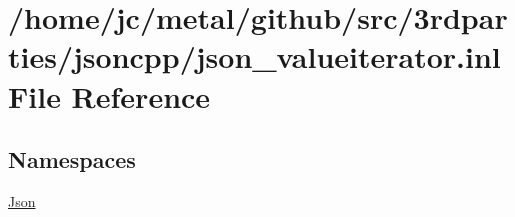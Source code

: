\hypertarget{json__valueiterator_8inl}{}\section{/home/jc/metal/github/src/3rdparties/jsoncpp/json\+\_\+valueiterator.inl File Reference}
\label{json__valueiterator_8inl}
\subsection*{Namespaces}
\begin{DoxyCompactItemize}
\item 
 \hyperlink{namespaceJson}{Json}
\end{DoxyCompactItemize}
